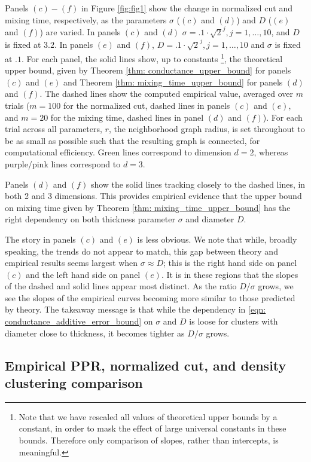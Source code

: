 \documentclass{article}
\newcommand{\1}{\mathbf{1}}
\theoremstyle{aldenthm}
\theoremstyle{aldenrmrk}
\begin{document}
Panels $(c) - (f)$ in Figure \ref{fig:fig1} show the change in normalized cut and mixing time, respectively, as the parameters $\sigma$ ($(c)$ and $(d)$) and $D$ ($(e)$ and $(f)$) are varied. In panels $(c)$ and $(d)$ $\sigma = .1 \cdot \sqrt{2}^j, j = 1,\ldots,10$, and $D$ is fixed at $3.2$. In panels $(e)$ and $(f)$, $D = .1 \cdot \sqrt{2}^j, j = 1,\ldots,10$ and $\sigma$ is fixed at $.1$.
For each panel, the solid lines show, up to constants \footnote{Note that we have rescaled all values of theoretical upper bounds by a constant, in order to mask the effect of large universal constants in these bounds. Therefore only comparison of slopes, rather than intercepts, is meaningful.}, the theoretical upper bound, given by Theorem \ref{thm: conductance_upper_bound} for panels $(c)$ and $(e)$ and Theorem \ref{thm: mixing_time_upper_bound} for panels $(d)$ and $(f)$. The dashed lines show the computed empirical value, averaged over $m$ trials ($m = 100$ for the normalized cut, dashed lines in panels $(c)$ and $(e)$, and $m = 20$ for the mixing time, dashed lines in panel $(d)$ and $(f)$). For each trial across all parameters, $r$, the neighborhood graph radius, is set throughout to be as small as possible such that the resulting graph is connected, for computational efficiency. Green lines correspond to dimension $d = 2$, whereas purple/pink lines correspond to $d = 3$. 

Panels $(d)$ and $(f)$ show the solid lines tracking closely to the dashed lines, in both 2 and 3 dimensions. This provides empirical evidence that the upper bound on mixing time given by Theorem \ref{thm: mixing_time_upper_bound} has the right dependency on both thickness parameter  $\sigma$ and diameter $D$.

The story in panels $(c)$ and $(e)$ is less obvious. We note that while, broadly speaking, the trends do not appear to match, this gap between theory and empirical results seems largest when $\sigma \approx D$; this is the right hand side on panel $(c)$ and the left hand side on panel $(e)$. It is in these regions that the slopes of the dashed and solid lines appear most distinct. As the ratio $D/\sigma$ grows, we see the slopes of the empirical curves becoming more similar to those predicted by theory. The takeaway message is that while the dependency in \eqref{eqn: conductance_additive_error_bound} on $\sigma$ and $D$ is loose for clusters with diameter close to thickness, it becomes tighter as $D/\sigma$ grows.


\subsection{Empirical PPR, normalized cut, and density clustering comparison}
\end{document}
